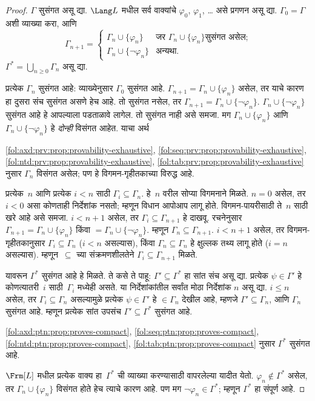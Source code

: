 \begin{proof}
$\Gamma$ सुसंगत असू द्या. $\Lang L$ मधील सर्व वाक्यांचे
$\varphi_0$, $\varphi_1$, \dots{} असे प्रगणन असू द्या. $\Gamma_0 = \Gamma$
अशी व्याख्या करा, आणि
\[\Gamma_{n+1} =
\begin{cases}
\Gamma_n \cup \{ \varphi_n \} & \textrm{जर $\Gamma_n \cup \{\varphi_n\}$
  सुसंगत असेल;} \\
\Gamma_n \cup \{ \lnot \varphi_n \} & \textrm{अन्यथा.}
\end{cases}
\]
$\Gamma^* = \bigcup_{n \geq 0} \Gamma_n$ असू द्या.

प्रत्येक $\Gamma_n$ सुसंगत आहे: व्याख्येनुसार $\Gamma_0$ सुसंगत आहे.
$\Gamma_{n+1} = \Gamma_n \cup \{\varphi_n\}$ असेल, तर याचे कारण हा
दुसरा संच सुसंगत असणे हेच आहे. तो सुसंगत नसेल, तर $\Gamma_{n+1} =
\Gamma_n \cup \{\lnot \varphi_n\}$. $\Gamma_n \cup \{\lnot \varphi_n\}$
सुसंगत आहे हे आपल्याला पडताळावे लागेल. तो सुसंगत नाही असे समजा. मग
$\Gamma_n \cup \{\varphi_n\}$ आणि $\Gamma_n \cup \{\lnot \varphi_n\}$ हे
\emph{दोन्ही} विसंगत आहेत. याचा अर्थ

  \ref{fol:axd:prv:prop:provability-exhaustive}, \ref{fol:seq:prv:prop:provability-exhaustive}, \ref{fol:ntd:prv:prop:provability-exhaustive}, \ref{fol:tab:prv:prop:provability-exhaustive}
नुसार $\Gamma_n$ विसंगत असेल; पण हे विगमन-गृहीतकाच्या विरुद्ध आहे.

प्रत्येक~$n$ आणि प्रत्येक $i < n$ साठी $\Gamma_i \subseteq \Gamma_n$.
हे~$n$ वरील सोप्या विगमनाने मिळते. $n=0$ असेल, तर $i < 0$ असा
कोणताही निर्देशांक नसतो; म्हणून विधान आपोआप लागू होते. विगमन-पायरीसाठी ते~$n$
साठी खरे आहे असे समजा. $i < n+1$ असेल, तर $\Gamma_i \subseteq
\Gamma_{n+1}$ हे दाखवू. रचनेनुसार $\Gamma_{n+1} = \Gamma_n \cup
\{\varphi_n\}$ किंवा $= \Gamma_n \cup \{\lnot \varphi_n\}$. म्हणून $\Gamma_n
\subseteq \Gamma_{n+1}$. $i < n+1$ असेल, तर विगमन-गृहीतकानुसार
$\Gamma_i \subseteq \Gamma_n$ ($i < n$ असल्यास), किंवा $\Gamma_n
\subseteq \Gamma_n$ हे क्षुल्लक तथ्य लागू होते ($i = n$ असल्यास).
म्हणून~$\subseteq$ च्या संक्रमणशीलतेने $\Gamma_i \subseteq
\Gamma_{n+1}$ मिळते.

यावरून $\Gamma^*$ सुसंगत आहे हे मिळते. ते कसे ते पाहू: $\Gamma'
\subseteq \Gamma^*$ हा सांत संच असू द्या. प्रत्येक $\psi \in \Gamma'$
हे कोणत्यातरी~$i$ साठी~$\Gamma_i$ मध्येही असते. या निर्देशांकांतील
सर्वांत मोठा निर्देशांक $n$ असू द्या. $i \le n$ असेल, तर $\Gamma_i
\subseteq \Gamma_n$ असल्यामुळे प्रत्येक $\psi \in \Gamma'$ हे
$\in \Gamma_n$ देखील आहे, म्हणजे $\Gamma' \subseteq \Gamma_n$, आणि
$\Gamma_n$ सुसंगत आहे. म्हणून प्रत्येक सांत उपसंच $\Gamma' \subseteq
\Gamma^*$ सुसंगत आहे.

  \ref{fol:axd:ptn:prop:proves-compact}, \ref{fol:seq:ptn:prop:proves-compact}, \ref{fol:ntd:ptn:prop:proves-compact}, \ref{fol:tab:ptn:prop:proves-compact} नुसार $\Gamma^*$
सुसंगत आहे.

$\Frm[L]$ मधील प्रत्येक वाक्य हा~$\Gamma^*$ ची व्याख्या
करण्यासाठी वापरलेल्या यादीत येतो. $\varphi_n \notin \Gamma^*$ असेल, तर
$\Gamma_n \cup \{\varphi_n\}$ विसंगत होते हेच त्याचे कारण आहे. पण मग
$\lnot \varphi_n \in \Gamma^*$; म्हणून $\Gamma^*$ हा संपूर्ण आहे.
\end{proof}
